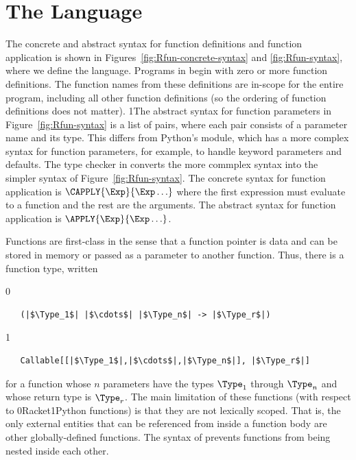 \documentclass[7x10]{TimesAPriori_MIT}%
\def\racketEd{0}
\def\pythonEd{1}
\def\edition{1}
\newcommand{\racket}[1]{{\if\edition\racketEd{#1}\fi}}
\newcommand{\python}[1]{{\if\edition\pythonEd #1\fi}}
\begin{document}
\section{The \LangFun{} Language}

The concrete and abstract syntax for function definitions and function
application is shown in Figures~\ref{fig:Rfun-concrete-syntax} and
\ref{fig:Rfun-syntax}, where we define the \LangFun{} language.  Programs in
\LangFun{} begin with zero or more function definitions.  The function
names from these definitions are in-scope for the entire program,
including all other function definitions (so the ordering of function
definitions does not matter).
%
\python{The abstract syntax for function parameters in
  Figure~\ref{fig:Rfun-syntax} is a list of pairs, where each pair
  consists of a parameter name and its type.  This differs from
  Python's \code{ast} module, which has a more complex syntax for
  function parameters, for example, to handle keyword parameters and
  defaults. The type checker in \code{type\_check\_Lfun} converts the
  more commplex syntax into the simpler syntax of
  Figure~\ref{fig:Rfun-syntax}.}
%
The concrete syntax for function application is $\CAPPLY{\Exp}{\Exp \ldots}$ where the first expression
must evaluate to a function and the rest are the arguments.  The
abstract syntax for function application is
$\APPLY{\Exp}{\Exp\ldots}$.


Functions are first-class in the sense that a function pointer
 is data and can be stored in memory or passed
as a parameter to another function.  Thus, there is a function
type, written
{\if\edition\racketEd
\begin{lstlisting}
   (|$\Type_1$| |$\cdots$| |$\Type_n$| -> |$\Type_r$|)
\end{lstlisting}
\fi}
{\if\edition\pythonEd
\begin{lstlisting}
   Callable[[|$\Type_1$|,|$\cdots$|,|$\Type_n$|], |$\Type_r$|]
\end{lstlisting}
\fi}
%
\noindent for a function whose $n$ parameters have the types $\Type_1$
through $\Type_n$ and whose return type is $\Type_r$. The main
limitation of these functions (with respect to
\racket{Racket}\python{Python} functions) is that they are not
lexically scoped. That is, the only external entities that can be
referenced from inside a function body are other globally-defined
functions. The syntax of \LangFun{} prevents functions from being
nested inside each other.
\end{document}
